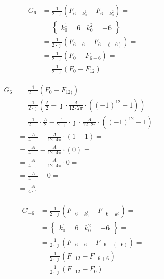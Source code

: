 \begin{task}

\begin{align*}
G_6 &= \frac{1}{2\cdot \jmath} \left( F_{6-k^1_0} - F_{6-k^2_0} \right) = \\
&=\left\{\begin{array}{ll}
k^1_0 = 6 & k^2_0 = -6
\end{array}\right\}=\\ 
&= \frac{1}{2\cdot \jmath} \left( F_{6-6} - F_{6-\left(-6\right)} \right) =\\
&= \frac{1}{2\cdot \jmath} \left( F_{0} - F_{6+6} \right) =\\
&= \frac{1}{2\cdot \jmath} \left( F_{0} - F_{12} \right)
\end{align*}


\begin{align*}
G_6 &= \frac{1}{2\cdot \jmath} \left( F_{0} - F_{12)} \right) =\\
&= \frac{1}{2\cdot \jmath} \left(\frac{A}{2} - \jmath \cdot \frac{A}{12\cdot 2 \pi}\cdot \left( (-1)^{12} -1 \right)\right) = \\
&= \frac{1}{2\cdot \jmath} \cdot \frac{A}{2} - \frac{1}{2\cdot \jmath} \cdot \jmath \cdot \frac{A}{12\cdot 2 \pi}\cdot \left( (-1)^{12} -1 \right) = \\
&= \frac{A}{4\cdot \jmath} - \frac{A}{12\cdot 4 \pi}\cdot \left( 1 -1 \right) = \\
&= \frac{A}{4\cdot \jmath} - \frac{A}{12\cdot 4 \pi}\cdot \left(0 \right) = \\
&= \frac{A}{4\cdot \jmath} - \frac{A}{12\cdot 4 \pi}\cdot 0 = \\
&= \frac{A}{4\cdot \jmath} -  0 = \\
&= \frac{A}{4\cdot \jmath}
\end{align*}



\begin{align*}
G_{-6} &= \frac{1}{2\cdot \jmath} \left( F_{-6-k^1_0} - F_{-6-k^2_0} \right) = \\
&=\left\{\begin{array}{ll}
k^1_0 = 6 & k^2_0 = -6
\end{array}\right\}=\\ 
&= \frac{1}{2\cdot \jmath} \left( F_{-6-6} - F_{-6-\left(-6\right)} \right) =\\
&= \frac{1}{2\cdot \jmath} \left( F_{-12} - F_{-6+6} \right) =\\
&= \frac{1}{2\cdot \jmath} \left( F_{-12} - F_{0} \right)
\end{align*}


\end{task}
